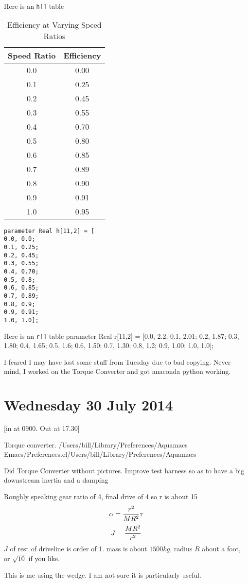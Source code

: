 \documentclass[11pt, oneside]{article}   	%
\begin{document}
Here is an \verb+h[]+ table
\begin{table}[h]
  \centering
  \begin{tabular}{| c | c |}
\hline
Speed Ratio & Efficiency \\
\hline
\hline
0.0 &  0.00 \\ 
0.1 &  0.25 \\ 
0.2 &  0.45 \\ 
0.3 &  0.55 \\ 
0.4 &  0.70 \\ 
0.5 &  0.80 \\ 
0.6 &  0.85 \\ 
0.7 &  0.89 \\ 
0.8 &  0.90 \\ 
0.9 &  0.91 \\ 
1.0 &  0.95 \\
\hline
  \end{tabular}
  \caption{Efficiency at Varying Speed Ratios}
  \label{tab:efficiency}
\end{table}
\begin{verbatim}
parameter Real h[11,2] = [
0.0, 0.0; 
0.1, 0.25; 
0.2, 0.45; 
0.3, 0.55; 
0.4, 0.70; 
0.5, 0.8; 
0.6, 0.85; 
0.7, 0.89; 
0.8, 0.9; 
0.9, 0.91; 
1.0, 1.0];
\end{verbatim}
Here is an \verb+r[]+ table
parameter Real r[11,2] = [0.0, 2.2; 0.1, 2.01; 0.2, 1.87; 0.3, 1.80; 0.4, 1.65; 0.5, 1.6; 0.6, 1.50; 0.7, 1.30; 0.8, 1.2; 0.9, 1.00; 1.0, 1.0];

I feared I may have lost some stuff from Tuesday due to bad copying.
Never mind, I worked on the Torque Converter and got anaconda python
working.

\section{Wednesday 30 July 2014}
[in at 0900.  Out at 17.30]

Torque converter.
/Users/bill/Library/Preferences/Aquamacs
Emacs/Preferences.el/Users/bill/Library/Preferences/Aquamacs

Did Torque Converter without pictures.
Improve test harness so as to have a big downstream inertia and a
damping

Roughly speaking gear ratio of 4, final drive of 4 so r is about 15
$$
\alpha = {r^2\over MR^2} \tau
$$
$$
J = {MR^2 \over r^2}
$$
$J$ of rest of driveline is order of 1.
mass is about $1500kg$, radius $R$ about a foot, or $ \sqrt{10} $ if
you like.

This is me using the wedge.  I am not sure it is particularly useful.
\end{document}
